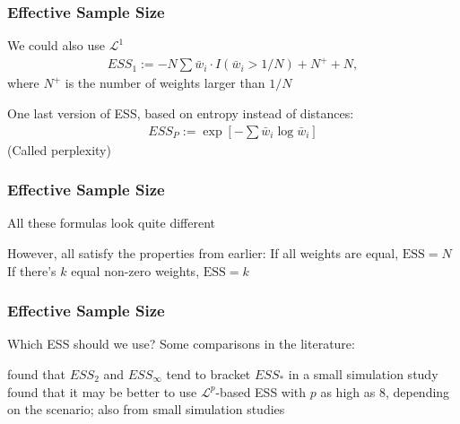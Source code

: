 \documentclass[14pt]{beamer}
\newcommand{\ess}{ESS_*}
\newcommand{\esst}{ESS_2}
\newcommand{\esso}{ESS_1}
\newcommand{\essi}{ESS_\infty}
\newcommand{\essp}{ESS_P}
\begin{document}
\begin{frame}
    \frametitle{Effective Sample Size}

    \begin{outline}
        \1 We could also use $\mathcal{L}^1$   
    \begin{gather*}
        \esso := -N \sum \bar{w}_i \cdot I(\bar{w}_i > 1/N) + N^+ + N,
    \end{gather*}
        where $N^+$ is the number of weights larger than $1/N$ \newline

        \1 One last version of ESS, based on entropy instead of distances:
        \begin{gather*}
            \essp := \exp \left[ - \sum \bar{w}_i \log \bar{w}_i \right]
        \end{gather*}
        (Called perplexity)

    \end{outline}
    

\end{frame}

\begin{frame}
    \frametitle{Effective Sample Size}

    \begin{outline}
        \1 All these formulas look quite different \newline

        \1 However, all satisfy the properties from earlier:
            \2 If all weights are equal, $\text{ESS}=N$
            \2 If there's $k$ equal non-zero weights, $\text{ESS}=k$ \newline

    \end{outline}
    

\end{frame}

\begin{frame}
    \frametitle{Effective Sample Size}

    \begin{outline}
        \1 Which ESS should we use? \newline
        \1 Some comparisons in the literature: 

            \2 \citet{Mar16} found that $\esst$ and $\essi$ tend to bracket $\ess$ in a small simulation study
            \2 \citet{Mar25} found that it may be better to use $\mathcal{L}^p$-based ESS with $p$ as high as 8, depending on the scenario; also from small simulation studies
    \end{outline}
\end{frame}
\end{document}
